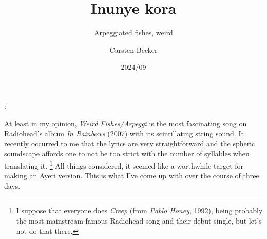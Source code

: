 \documentclass[12pt,paper=a4]{scrartcl}
\author{Carsten Becker}
\title{Inunye kora}
\subtitle{Arpeggiated fishes, weird}
\date{2024/09} %
\newcommand{\tit}[1]{\textit{#1}} %
\newenvironment{mytitle}{
	\hfill
	\begin{minipage}{0.667\textwidth}
	\vspace{\baselineskip}
	\begin{center}
		\Large
		\sffamily\bfseries
		\makeatletter
}{
		\makeatother
	\end{center}
	\vspace{1em}
	\end{minipage}
	\hfill
}
\begin{document}

\begin{mytitle}
	\@title: \@subtitle
\end{mytitle}

At least in my opinion, \tit{Weird Fishes/Arpeggi} is the most fascinating song
on Radiohead's album \tit{In Rainbows} (2007) with its scintillating string
sound. It recently occurred to me that the lyrics are very straightforward and
the spheric soundscape affords one to not be too strict with the number of
syllables when translating it.%
%
	\footnote{I suppose that everyone does \tit{Creep} (from \tit{Pablo Honey},
	1992), being probably the most mainstream-famous Radiohead song and their
	debut single, but let's not do that there.}
%
All things considered, it seemed like a worthwhile target for making an Ayeri
version. This is what I've come up with over the course of three days.
\end{document}

